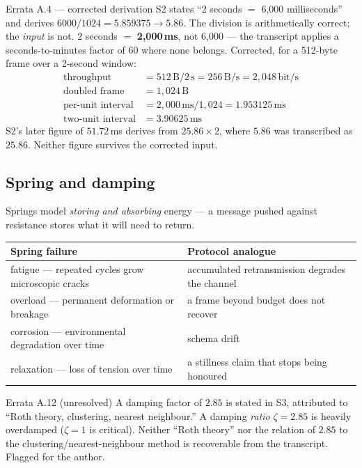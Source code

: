 \documentclass[11pt,a4paper]{article}
\begin{document}
\begin{errata}{Errata A.4 --- corrected derivation}
S2 states ``2 seconds $=$ 6,000 milliseconds'' and derives
$6000/1024 = 5.859375 \rightarrow 5.86$. The division is arithmetically correct;
the \emph{input} is not. $2$ seconds $=$ \textbf{2,000\,ms}, not 6,000 --- the
transcript applies a seconds-to-minutes factor of 60 where none belongs.
Corrected, for a 512-byte frame over a 2-second window:
\begin{align*}
\text{throughput} &= 512\,\text{B} / 2\,\text{s} = 256\,\text{B/s} = 2{,}048\,\text{bit/s} \\
\text{doubled frame} &= 1{,}024\,\text{B} \\
\text{per-unit interval} &= 2{,}000\,\text{ms} / 1{,}024 = 1.953125\,\text{ms} \\
\text{two-unit interval} &= 3.90625\,\text{ms}
\end{align*}
S2's later figure of $51.72$\,ms derives from $25.86 \times 2$, where $5.86$ was
transcribed as $25.86$. Neither figure survives the corrected input.
\end{errata}

\subsection{Spring and damping}

Springs model \emph{storing and absorbing} energy --- a message pushed against
resistance stores what it will need to return.

\begin{center}
\begin{tabular}{@{}>{\raggedright\arraybackslash}p{6.4cm}>{\raggedright\arraybackslash}p{7.6cm}@{}}
\toprule
\textbf{Spring failure} & \textbf{Protocol analogue} \\
\midrule
fatigue --- repeated cycles grow microscopic cracks & accumulated retransmission degrades the channel \\
overload --- permanent deformation or breakage & a frame beyond budget does not recover \\
corrosion --- environmental degradation over time & schema drift \\
relaxation --- loss of tension over time & a stillness claim that stops being honoured \\
\bottomrule
\end{tabular}
\end{center}

\begin{errata}{Errata A.12 (unresolved)}
A damping factor of $2.85$ is stated in S3, attributed to ``Roth theory,
clustering, nearest neighbour.'' A damping \emph{ratio} $\zeta = 2.85$ is
heavily overdamped ($\zeta = 1$ is critical). Neither ``Roth theory'' nor the
relation of $2.85$ to the clustering/nearest-neighbour method is recoverable
from the transcript. Flagged for the author.
\end{errata}
\end{document}
